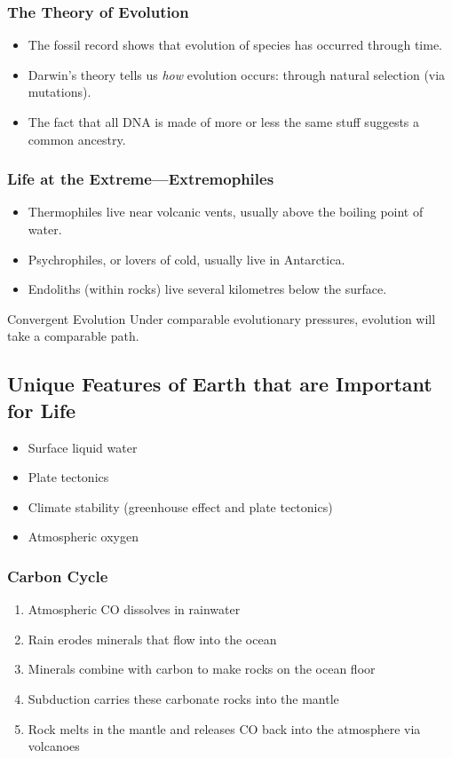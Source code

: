 \documentclass[class=article, crop=false]{standalone}
\begin{document}
  \subsubsection{The Theory of Evolution}
  \begin{itemize}
    \item The fossil record shows that evolution of species has occurred through time.
    \item Darwin's theory tells us \emph{how} evolution occurs: through natural selection (via mutations).
    \item The fact that all DNA is made of more or less the same stuff suggests a common ancestry.
  \end{itemize}
  \subsubsection{Life at the Extreme---Extremophiles}
  \begin{itemize}
    \item Thermophiles live near volcanic vents, usually above the boiling point of water.
    \item Psychrophiles, or lovers of cold, usually live in Antarctica.
    \item Endoliths (within rocks) live several kilometres below the surface.
  \end{itemize}
  \begin{definition}{Convergent Evolution}
    Under comparable evolutionary pressures, evolution will take a comparable path.
  \end{definition}
  \subsection{Unique Features of Earth that are Important for Life}
  \begin{itemize}
    \item Surface liquid water
    \item Plate tectonics
    \item Climate stability (greenhouse effect and plate tectonics)
    \item Atmospheric oxygen
  \end{itemize}
  \subsubsection{Carbon Cycle}
  \begin{enumerate}
    \item Atmospheric CO dissolves in rainwater
    \item Rain erodes minerals that flow into the ocean
    \item Minerals combine with carbon to make rocks on the ocean floor
    \item Subduction carries these carbonate rocks into the mantle
    \item Rock melts in the mantle and releases CO back into the atmosphere via volcanoes
  \end{enumerate}
\end{document}
